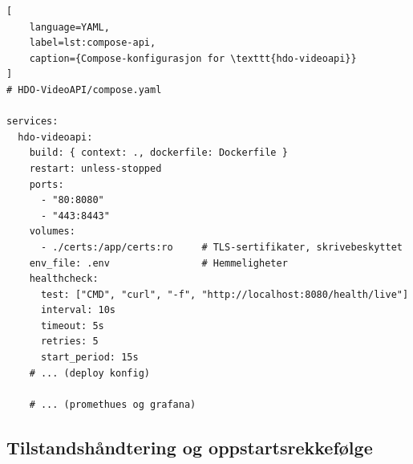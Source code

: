
\begin{lstlisting}[
    language=YAML,
    label=lst:compose-api,
    caption={Compose-konfigurasjon for \texttt{hdo-videoapi}}
]
# HDO-VideoAPI/compose.yaml

services:
  hdo-videoapi:
    build: { context: ., dockerfile: Dockerfile }
    restart: unless-stopped
    ports:
      - "80:8080"
      - "443:8443"
    volumes:
      - ./certs:/app/certs:ro     # TLS-sertifikater, skrivebeskyttet
    env_file: .env                # Hemmeligheter
    healthcheck:
      test: ["CMD", "curl", "-f", "http://localhost:8080/health/live"]
      interval: 10s
      timeout: 5s
      retries: 5
      start_period: 15s
    # ... (deploy konfig)

    # ... (promethues og grafana)
\end{lstlisting}


\subsection{Tilstandshåndtering og oppstartsrekkefølge}
\label{subsec:docker-state}



